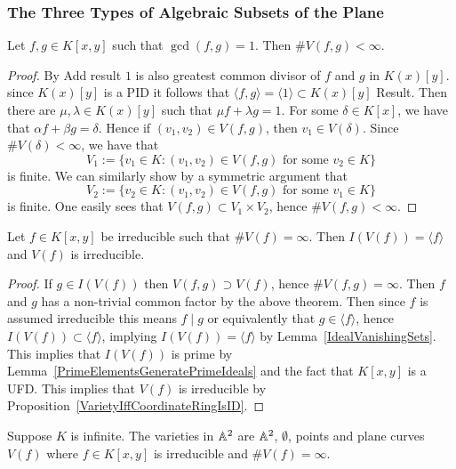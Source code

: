 \subsubsection{The Three Types of Algebraic Subsets of the Plane}
\begin{theorem}\label{BezoutForCurves}
    Let $f,g\in K[x,y]$ such that $\gcd(f,g)=1$. Then $\#V(f,g) < \infty$.
\end{theorem}
\begin{proof}
    By {\LARGE Add result} $1$ is also greatest common divisor of $f$ and $g$ in $K(x)[y]$. since $K(x)[y]$ is a PID it follows that $\langle f,g\rangle = \langle 1\rangle\subset K(x)[y]$ {\LARGE Result}. Then there are $\mu,\lambda \in K(x)[y]$ such that $\mu f + \lambda g = 1$. For some $\delta\in K[x]$, we have that $\alpha f+ \beta g = \delta$. Hence if $(v_1,v_2)\in V(f,g)$, then $v_1\in V(\delta)$. Since $\#V(\delta) < \infty$, we have that 
    $$V_1 := \{v_1\in K : (v_1,v_2)\in V(f,g) \text{ for some } v_2\in K\}$$
    is finite. We can similarly show by a symmetric argument that 
    $$V_2 := \{v_2\in K : (v_1,v_2)\in V(f,g) \text{ for some } v_1\in K\}$$
    is finite.
    One easily sees that $V(f,g)\subset V_1\times V_2$, hence $\#V(f,g) <\infty$.  
\end{proof}
\begin{corollary}\label{InfiniteVanishingSetOfIrredublePolynomialIsVariety}
    Let $f\in K[x,y]$ be irreducible such that $\#V(f)=\infty$. Then $I(V(f))=\langle f\rangle$ and $V(f)$ is irreducible. 
\end{corollary}
\begin{proof}
    If $g\in I(V(f))$ then $V(f,g)\supset V(f)$, hence $\#V(f,g) = \infty$. Then $f$ and $g$ has a non-trivial common factor by the above theorem. Then since $f$ is assumed irreducible this means $f\mid g$ or equivalently that $g\in \langle f\rangle$, hence $I(V(f))\subset \langle f\rangle$, implying $I(V(f)) = \langle f\rangle$ by Lemma~\ref{IdealVanishingSets}. This implies that $I(V(f))$ is prime by Lemma~\ref{PrimeElementsGeneratePrimeIdeals} and the fact that $K[x,y]$ is a UFD. This implies that $V(f)$ is irreducible by Proposition~\ref{VarietyIffCoordinateRingIsID}.
\end{proof}
\begin{corollary}\label{ClassificationOfAlgebraicSetsInThePlaneOverInfiniteFields}
    Suppose $K$ is infinite. The varieties in $\mathbb{A}^2$ are $\mathbb{A}^2$, $\emptyset$, points and plane curves $V(f)$ where $f\in K[x,y]$ is irreducible and $\#V(f)=\infty$.
\end{corollary}
